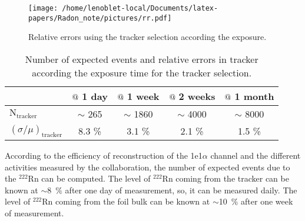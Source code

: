 \documentclass[main.tex]{subfiles}
\begin{document}
\begin{figure}[h!]
\begin{center}
\texttt{[image: /home/lenoblet-local/Documents/latex-papers/Radon\_note/pictures/rr.pdf]}
\caption{Relative errors using the tracker selection according the exposure.}
\label{picture_relative_error_tracker_selection}
\end{center}
\end{figure}


\begin{table}[h!]
\begin{center}
\begin{tabular}{l|c|c|c|c}
      & $\symbol{64}~$1 day  & $\symbol{64}~$1 week  & $\symbol{64}~$2 weeks & $\symbol{64}~$1 month  \\
\hline
$\text{N}_\text{tracker}$         & $\sim$ 265 & $\sim$ 1860 & $\sim$ 4000 & $\sim$ 8000 \\ 
$(\sigma / \mu)_{\text{tracker}}$ & 8.3 \%     & 3.1  \%     & 2.1  \%     & 1.5  \% \\
\hline
\end{tabular}
\end{center}
\caption{Number of expected events and relative errors in tracker according the exposure time for the tracker selection.}
\label{table_number_of_expected_events_relative_error_tracker_selection}
\end{table}


\bigskip
\FloatBarrier




\bigskip


\noindent According to the efficiency of reconstruction of the 1e1$\alpha$ channel and the different activities measured by the collaboration, the number of expected events due to the $^{222}$Rn can be computed. The level of $^{222}$Rn coming from the tracker can be known at $\sim$8~$\%$ after one day of measurement, so, it can be measured daily. The level of $^{222}$Rn coming from the foil bulk can be known at $\sim$10~$\%$ after one week of measurement.
\end{document}
